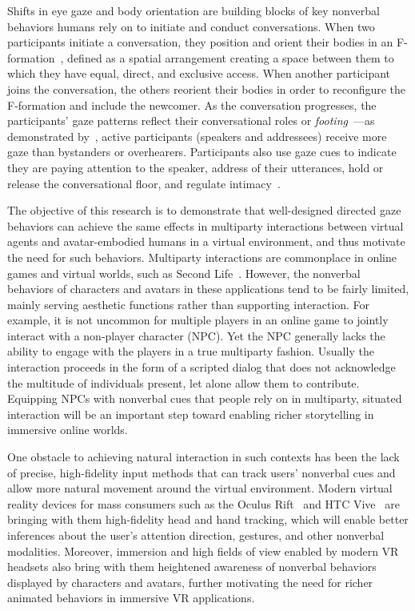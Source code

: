 Shifts in eye gaze and body orientation are building blocks of key nonverbal behaviors humans rely on to initiate and conduct conversations. When two participants initiate a conversation, they position and orient their bodies in an F-formation~\citep{kendon1990conducting}, defined as a spatial arrangement creating a space between them to which they have equal, direct, and exclusive access. When another participant joins the conversation, the others reorient their bodies in order to reconfigure the F-formation and include the newcomer. As the conversation progresses, the participants' gaze patterns reflect their conversational roles or \emph{footing}~\citep{goffman1979footing}---as demonstrated by~\citet{mutlu2012conversational}, active participants (speakers and addressees) receive more gaze than bystanders or overhearers. Participants also use gaze cues to indicate they are paying attention to the speaker, address of their utterances, hold or release the conversational floor, and regulate intimacy~\citep{heylen2006head}.

The objective of this research is to demonstrate that well-designed directed gaze behaviors can achieve the same effects in multiparty interactions between virtual agents and avatar-embodied humans in a virtual environment, and thus motivate the need for such behaviors. Multiparty interactions are commonplace in online games and virtual worlds, such as Second Life~\citep{secondlife}. However, the nonverbal behaviors of characters and avatars in these applications tend to be fairly limited, mainly serving aesthetic functions rather than supporting interaction.
For example, it is not uncommon for multiple players in an online game to jointly interact with a non-player character (NPC). Yet the NPC generally lacks the ability to engage with the players in a true multiparty fashion. Usually the interaction proceeds in the form of a scripted dialog that does not acknowledge the multitude of individuals present, let alone allow them to contribute. Equipping NPCs with nonverbal cues that people rely on in multiparty, situated interaction will be an important step toward enabling richer storytelling in immersive online worlds.

One obstacle to achieving natural interaction in such contexts has been the lack of precise, high-fidelity input methods that can track users' nonverbal cues and allow more natural movement around the virtual environment. Modern virtual reality devices for mass consumers such as the Oculus Rift~\citep{oculus} and HTC Vive~\citep{vive} are bringing with them high-fidelity head and hand tracking, which will enable better inferences about the user's attention direction, gestures, and other nonverbal modalities. Moreover, immersion and high fields of view enabled by modern VR headsets also bring with them heightened awareness of nonverbal behaviors displayed by characters and avatars, further motivating the need for richer animated behaviors in immersive VR applications.

